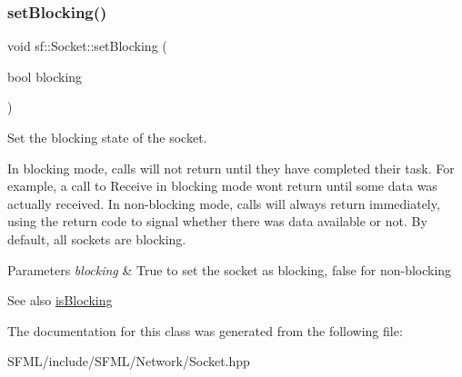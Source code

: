 \subsubsection{\texorpdfstring{setBlocking()}{setBlocking()}}
{\footnotesize\ttfamily void sf\+::\+Socket\+::set\+Blocking (\begin{DoxyParamCaption}\item[{bool}]{blocking }\end{DoxyParamCaption})}



Set the blocking state of the socket. 

In blocking mode, calls will not return until they have completed their task. For example, a call to Receive in blocking mode won\textquotesingle{}t return until some data was actually received. In non-\/blocking mode, calls will always return immediately, using the return code to signal whether there was data available or not. By default, all sockets are blocking.


\begin{DoxyParams}{Parameters}
{\em blocking} & True to set the socket as blocking, false for non-\/blocking\\
\hline
\end{DoxyParams}
\begin{DoxySeeAlso}{See also}
\mbox{\hyperlink{classsf_1_1_socket_ab1ceca9ac114b8baeeda3b34a0aca468}{is\+Blocking}} \begin{DoxyVerb}\end{DoxyVerb}
 
\end{DoxySeeAlso}


The documentation for this class was generated from the following file\+:\begin{DoxyCompactItemize}
\item 
S\+F\+M\+L/include/\+S\+F\+M\+L/\+Network/Socket.\+hpp\end{DoxyCompactItemize}
